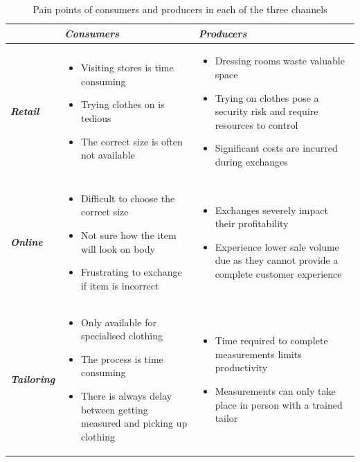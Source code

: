 \begin{table}[htbp]
	\centering
	\caption{Pain points of consumers and producers in each of the three channels}
	\begin{tabularx}{\textwidth}{|Y|Y|Y|}
		\toprule
		& 
		\textit{\textbf{Consumers}} & 
		\textit{\textbf{Producers}} \\
		\midrule
		\textit{\textbf{Retail}} & 
		\begin{itemize}
			\item Visiting stores is time consuming
			\item Trying clothes on is tedious
			\item The correct size is often not available 
		\end{itemize} & 
		\begin{itemize}
			\item Dressing rooms waste valuable space
			\item Trying on clothes pose a security risk and require resources to control
			\item Significant costs are incurred during exchanges 
		\end{itemize} \\
		\midrule
		\textit{\textbf{Online}} & 
		\begin{itemize}
			\item Difficult to choose the correct size
			\item Not sure how the item will look on body
			\item Frustrating to exchange if item is incorrect
		\end{itemize} & 
		\begin{itemize}
			\item Exchanges severely impact their profitability
			\item Experience lower sale volume due as they cannot provide a complete customer experience
		\end{itemize}\\
		\midrule
		\textit{\textbf{Tailoring}} & 
		\begin{itemize}
			\item Only available for specialised clothing
			\item The process is time consuming
			\item There is always delay between getting measured and picking up clothing
		\end{itemize} & 
		\begin{itemize}
			\item Time required to complete measurements limits productivity
			\item Measurements can only take place in person with a trained tailor
		\end{itemize} \\
		\bottomrule
	\end{tabularx}%
	\label{tab:conProdPainPoints}%
\end{table}%


